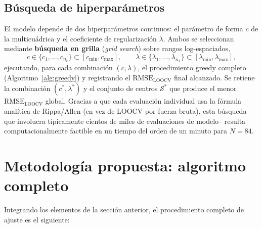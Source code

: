 \documentclass[11pt,a4paper]{article}
\begin{document}
\subsection{B\'usqueda de hiperpar\'ametros}
\label{subsec:hypersearch}

El modelo depende de dos hiperpar\'ametros continuos: el par\'ametro de forma
$c$ de la multicu\'adrica y el coeficiente de regularizaci\'on $\lambda$.
Ambos se seleccionan mediante \textbf{b\'usqueda en grilla}
(\emph{grid search}) sobre rangos log-espaciados,
\[
c \in \{c_1,\dots,c_{n_c}\} \subset [c_{\min}, c_{\max}], \qquad
\lambda \in \{\lambda_1,\dots,\lambda_{n_\lambda}\} \subset
[\lambda_{\min},\lambda_{\max}],
\]
ejecutando, para cada combinaci\'on $(c,\lambda)$, el procedimiento greedy
completo (Algoritmo~\ref{alg:greedy}) y registrando el
$\text{RMSE}_{\text{LOOCV}}$ final alcanzado. Se retiene la combinaci\'on
$(c^\ast,\lambda^\ast)$ y el conjunto de centros $\mathcal{S}^\ast$ que
produce el menor $\text{RMSE}_{\text{LOOCV}}$ global. Gracias a que cada
evaluaci\'on individual usa la f\'ormula anal\'itica de Rippa/Allen (en vez de
LOOCV por fuerza bruta), esta b\'usqueda --que involucra t\'ipicamente
cientos de miles de evaluaciones de modelo-- resulta computacionalmente
factible en un tiempo del orden de un minuto para $N=84$.

\section{Metodolog\'ia propuesta: algoritmo completo}

Integrando los elementos de la secci\'on anterior, el procedimiento completo
de ajuste es el siguiente:
\end{document}
